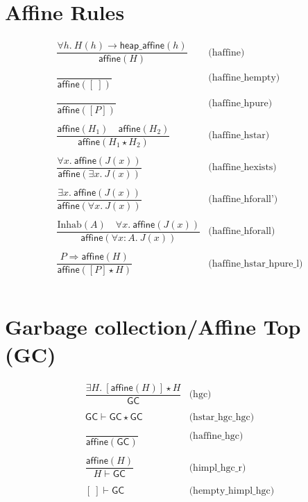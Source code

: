 \documentclass[10pt,a4paper]{article}
\newcommand{\emp}{[\: ]} %
\newcommand{\himpl}{\vdash}
\newcommand{\heapaffine}[1]{\mathsf{heap\_affine}(#1)}
\newcommand{\haffine}[1]{\mathsf{affine}(#1)}
\newcommand{\hgc}{\mathsf{GC}} %
\begin{document}
\begin{multicols}{2}
\section*{Affine Rules}
\[
  \begin{array}{cl}
  \dfrac{\forall h.~ H(h) \rightarrow \heapaffine{h}}
  {\haffine{H}} & \text{(haffine)} \\
  \\
 \dfrac{}
  {\haffine{\emp}} & \text{(haffine\_hempty)} \\
  \\
  \dfrac{}
 {\haffine{[P]}} & \text{(haffine\_hpure)} \\
 \\
  \dfrac{\haffine{H_1} \quad \haffine{H_2}}
  { \haffine{H_1 \star H_2}} & \text{(haffine\_hstar)} \\
  \\  
  \dfrac{\forall x.~ \haffine{J(x)}}
  {\haffine{\exists x.~ J(x)}} & \text{(haffine\_hexists)} \\ 
 \\
  \dfrac{\exists x.~ \haffine{J(x)}}
  {\haffine{\forall x.~ J(x)}} & \text{(haffine\_hforall')} \\
  \\
  \dfrac{\text{Inhab}(A) \quad \forall x.~ \haffine{J(x)}}
  {\haffine{\forall x:A.~ J(x)}} & \text{(haffine\_hforall)} \\
 \\
  \dfrac{P \Rightarrow \haffine{H}}
  {\haffine{[P] \star H}} & \text{(haffine\_hstar\_hpure\_l)} \\
  \\

\end{array}
\]

\section*{Garbage collection/Affine Top (GC)}
\[
\begin{array}{cl}
  \dfrac{\exists H.~ [\haffine{H}] \star H}
  {\hgc} & \text{(hgc)} \\
  \\
  {\hgc}
  \himpl
  {\hgc \star \hgc} & \text{(hstar\_hgc\_hgc)} \\
  \\
  \dfrac{}
  {\haffine \hgc} & \text{(haffine\_hgc)} \\
  \\
  \dfrac{\haffine{H}}
  {H \himpl \hgc} & \text{(himpl\_hgc\_r)} \\
  \\
  {\emp}
  \himpl
  {\hgc} & \text{(hempty\_himpl\_hgc)} \\
  \\
  

\end{array}\]
\end{multicols}
\end{document}
